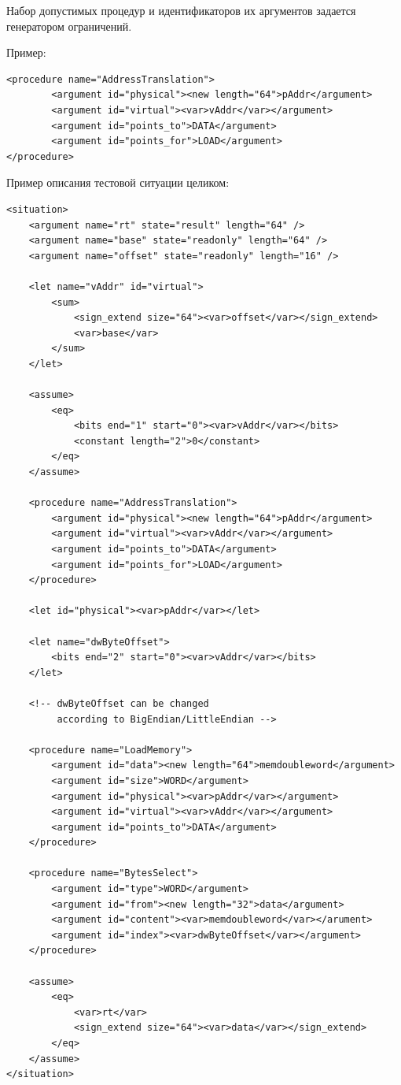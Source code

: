 Набор допустимых процедур и идентификаторов их аргументов задается
генератором ограничений.

Пример: {\small
\begin{verbatim}
<procedure name="AddressTranslation">
        <argument id="physical"><new length="64">pAddr</argument>
        <argument id="virtual"><var>vAddr</var></argument>
        <argument id="points_to">DATA</argument>
        <argument id="points_for">LOAD</argument>
</procedure>
\end{verbatim}}

Пример описания тестовой ситуации целиком: {\small
\begin{verbatim}
<situation>
    <argument name="rt" state="result" length="64" />
    <argument name="base" state="readonly" length="64" />
    <argument name="offset" state="readonly" length="16" />

    <let name="vAddr" id="virtual">
        <sum>
            <sign_extend size="64"><var>offset</var></sign_extend>
            <var>base</var>
        </sum>
    </let>

    <assume>
        <eq>
            <bits end="1" start="0"><var>vAddr</var></bits>
            <constant length="2">0</constant>
        </eq>
    </assume>

    <procedure name="AddressTranslation">
        <argument id="physical"><new length="64">pAddr</argument>
        <argument id="virtual"><var>vAddr</var></argument>
        <argument id="points_to">DATA</argument>
        <argument id="points_for">LOAD</argument>
    </procedure>

    <let id="physical"><var>pAddr</var></let>

    <let name="dwByteOffset">
        <bits end="2" start="0"><var>vAddr</var></bits>
    </let>

    <!-- dwByteOffset can be changed
         according to BigEndian/LittleEndian -->

    <procedure name="LoadMemory">
        <argument id="data"><new length="64">memdoubleword</argument>
        <argument id="size">WORD</argument>
        <argument id="physical"><var>pAddr</var></argument>
        <argument id="virtual"><var>vAddr</var></argument>
        <argument id="points_to">DATA</argument>
    </procedure>

    <procedure name="BytesSelect">
        <argument id="type">WORD</argument>
        <argument id="from"><new length="32">data</argument>
        <argument id="content"><var>memdoubleword</var></arument>
        <argument id="index"><var>dwByteOffset</var></argument>
    </procedure>

    <assume>
        <eq>
            <var>rt</var>
            <sign_extend size="64"><var>data</var></sign_extend>
        </eq>
    </assume>
</situation>
\end{verbatim}}

